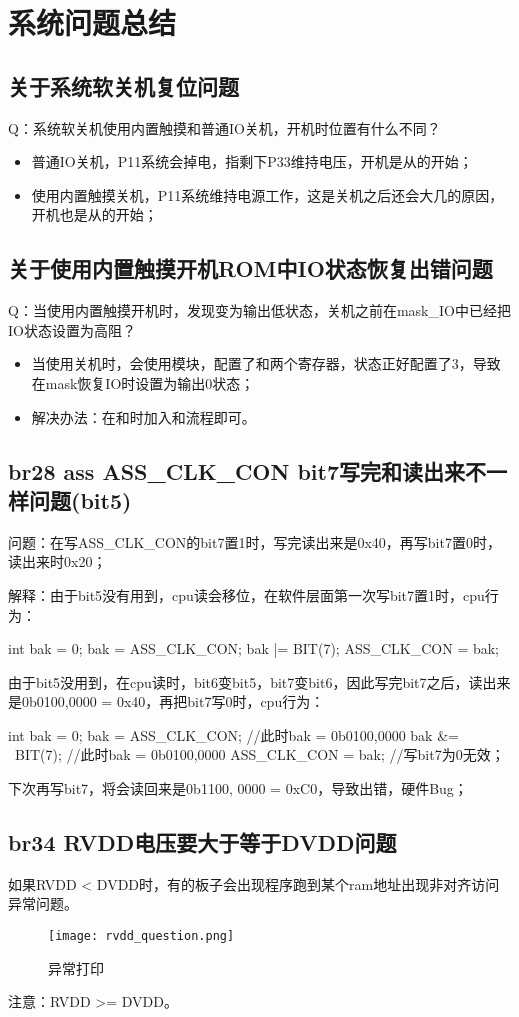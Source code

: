 \section{系统问题总结}
\subsection{关于系统软关机复位问题}
Q：系统软关机使用内置触摸和普通IO关机，开机时位置有什么不同？
\begin{itemize}
    \item 普通IO关机，P11系统会掉电，指剩下P33维持电压，开机是从的开始；
    \item 使用内置触摸关机，P11系统维持电源工作，这是关机之后还会大几的原因，开机也是从的开始；
\end{itemize}

\subsection{关于使用内置触摸开机ROM中IO状态恢复出错问题}
Q：当使用内置触摸开机时，发现变为输出低状态，关机之前在mask\_IO中已经把IO状态设置为高阻？
\begin{itemize}
    \item 当使用关机时，会使用模块，配置了和两个寄存器，状态正好配置了3，导致在mask恢复IO时设置为输出0状态；
    \item 解决办法：在和时加入和流程即可。
\end{itemize}

\subsection{br28 ass ASS\_CLK\_CON bit7写完和读出来不一样问题(bit5)}
问题：在写ASS\_CLK\_CON的bit7置1时，写完读出来是0x40，再写bit7置0时，读出来时0x20；

解释：由于bit5没有用到，cpu读会移位，在软件层面第一次写bit7置1时，cpu行为：
\begin{myccode}
    {
        int bak = 0;
        bak = ASS_CLK_CON;
        bak |= BIT(7);
        ASS_CLK_CON = bak;
    }
\end{myccode}
由于bit5没用到，在cpu读时，bit6变bit5，bit7变bit6，因此写完bit7之后，读出来是0b0100,0000 = 0x40，再把bit7写0时，cpu行为：
\begin{myccode}
    {
        int bak = 0;
        bak = ASS_CLK_CON;  //此时bak = 0b0100,0000
        bak &= ~BIT(7);     //此时bak = 0b0100,0000
        ASS_CLK_CON = bak;  //写bit7为0无效；
    }
\end{myccode}
下次再写bit7，将会读回来是0b1100, 0000 = 0xC0，导致出错，硬件Bug；

\subsection{br34 RVDD电压要大于等于DVDD问题}
如果RVDD < DVDD时，有的板子会出现程序跑到某个ram地址出现非对齐访问异常问题。
\begin{figure}[H]
\centering
\texttt{[image: rvdd\_question.png]}
\caption{异常打印}
\label{fig:rvdd_exeception}
\end{figure}
注意：RVDD >= DVDD。

